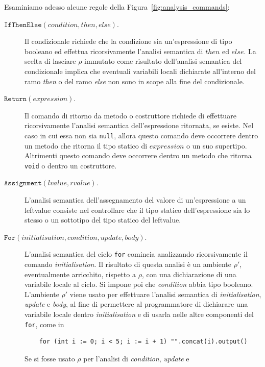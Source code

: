Esaminiamo adesso alcune regole della Figura~\ref{fig:analysis_commands}:
%
\begin{description}
\item[\underline{$\mathtt{IfThenElse(\mathit{condition},\mathit{then},\mathit{else})}$}.]
  Il condizionale richiede che la condizione sia un'espressione di tipo
  booleano ed effettua ricorsivamente
  l'analisi semantica di $\mathit{then}$ ed $\mathit{else}$.
  La scelta di lasciare $\rho$ immutato come risultato
  dell'analisi semantica del condizionale implica che eventuali variabili
  locali dichiarate all'interno del ramo \textit{then} o del
  ramo \textit{else} non sono \piu in scope alla fine del condizionale.
\item[\underline{$\mathtt{Return(\mathit{expression})}$}.]
  Il comando di ritorno da metodo o costruttore richiede di effettuare
  ricorsivamente l'analisi semantica dell'espressione ritornata, se esiste.
  Nel caso in cui essa non sia \texttt{null}, allora questo comando deve
  occorrere dentro un metodo che ritorna il tipo statico
  di $\mathit{expression}$ o un suo supertipo. Altrimenti questo comando
  deve occorrere dentro un metodo che ritorna \texttt{void} o dentro
  un costruttore.
\item[\underline{$\mathtt{Assignment(\mathit{lvalue},\mathit{rvalue})}$}.]
  L'analisi semantica dell'assegnamento del valore di un'espressione
  a un leftvalue consiste nel controllare che il tipo statico dell'espressione
  sia lo stesso o un sottotipo del tipo statico del leftvalue.
\item[\underline{$\mathtt{For(\mathit{initialisation},\mathit{condition},
  \mathit{update},\mathit{body})}$}.]
  L'analisi semantica del ciclo \texttt{for} comincia analizzando
  ricorsivamente il comando \textit{initialisation}. Il risultato di questa
  analisi \`e un ambiente $\rho'$, eventualmente arricchito, rispetto a
  $\rho$, con una dichiarazione di una variabile locale al ciclo.
  Si impone poi che \textit{condition} abbia tipo booleano. L'ambiente $\rho'$
  viene usato per effettuare l'analisi
  semantica di \textit{initialisation}, \textit{update} e \textit{body},
  al fine di permettere al programmatore di dichiarare una variabile locale
  dentro \textit{initialisation} e di usarla nelle altre componenti del
  \texttt{for}, come in
  \begin{verbatim}
    for (int i := 0; i < 5; i := i + 1) "".concat(i).output()
  \end{verbatim}
  \vspace*{-2.5ex}
  Se si fosse usato $\rho$ per l'analisi di \emph{condition}, \emph{update} e

\end{description}

